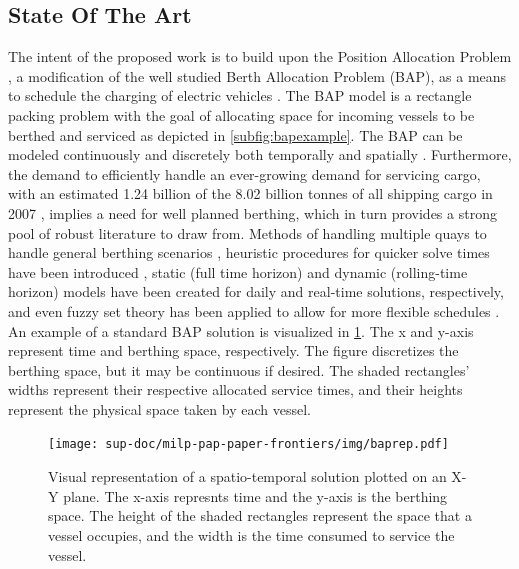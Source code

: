 \documentclass[ee,msthesis]{usuthesis}
\begin{document}
\subsection{State Of The Art}
\label{sec:org150cdee}
The intent of the proposed work is to build upon the Position Allocation Problem \cite{qarebagh-2019-optim-sched}, a
modification of the well studied Berth Allocation Problem (BAP), as a means to schedule the charging of electric
vehicles \cite{buhrkal-2011-model-discr,frojan-2015-contin-berth,imai-2001-dynam-berth}. The BAP model is a rectangle
packing problem with the goal of allocating space for incoming vessels to be berthed and serviced as depicted in
\autoref{subfig:bapexample}. The BAP can be modeled continuously and discretely both temporally and spatially
\cite{buhrkal-2011-model-discr,frojan-2015-contin-berth}. Furthermore, the demand to efficiently handle an
ever-growing demand for servicing cargo, with an estimated 1.24 billion of the 8.02 billion tonnes of all shipping cargo
in 2007 \cite{buhrkal-2011-model-discr}, implies a need for well planned berthing, which in turn provides a strong pool
of robust literature to draw from. Methods of handling multiple quays to handle general berthing scenarios
\cite{frojan-2015-contin-berth,dai-2008-suppl-chain-analy}, heuristic procedures for quicker solve times have been
introduced \cite{imai-2001-dynam-berth}, static (full time horizon) and dynamic (rolling-time horizon) models have been
created for daily and real-time solutions, respectively, and even fuzzy set theory has been applied to allow for more
flexible schedules \cite{bello-2019-fuzzy-activ}. An example of a standard BAP solution is visualized in \ref{img:baprep}.
The x and y-axis represent time and berthing space, respectively. The figure discretizes the berthing space, but it may
be continuous if desired. The shaded rectangles' widths represent their respective allocated service times, and their
heights represent the physical space taken by each vessel.

\begin{figure}[htbp]
\centering
\texttt{[image: sup-doc/milp-pap-paper-frontiers/img/baprep.pdf]}
\caption{\label{img:baprep}Visual representation of a spatio-temporal solution plotted on an X-Y plane. The x-axis represnts time and the y-axis is the berthing space. The height of the shaded rectangles represent the space that a vessel occupies, and the width is the time consumed to service the vessel.}
\end{figure}
\end{document}
